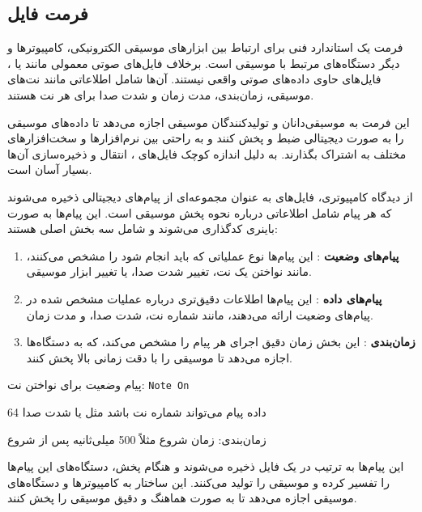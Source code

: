 \subsection{فرمت فایل }

فرمت   \cite{de2017understanding} یک استاندارد فنی برای ارتباط بین ابزارهای موسیقی الکترونیکی، کامپیوترها و دیگر دستگاه‌های مرتبط با موسیقی است. برخلاف فایل‌های صوتی معمولی مانند  یا ، فایل‌های  حاوی داده‌های صوتی واقعی نیستند. آن‌ها شامل اطلاعاتی مانند نت‌های موسیقی، زمان‌بندی، مدت زمان و شدت صدا برای هر نت هستند.

این فرمت به موسیقی‌دانان و تولیدکنندگان موسیقی اجازه می‌دهد تا داده‌های موسیقی را به صورت دیجیتالی ضبط و پخش کنند و به راحتی بین نرم‌افزارها و سخت‌افزارهای مختلف به اشتراک بگذارند. به دلیل اندازه کوچک فایل‌های ، انتقال و ذخیره‌سازی آن‌ها بسیار آسان است.

از دیدگاه کامپیوتری، فایل‌های  به عنوان مجموعه‌ای از پیام‌های دیجیتالی ذخیره می‌شوند که هر پیام شامل اطلاعاتی درباره نحوه پخش موسیقی است. این پیام‌ها به صورت باینری کدگذاری می‌شوند و شامل سه بخش اصلی هستند:

\begin{enumerate}
      \def\labelenumi{\arabic{enumi}.}
      \item
            \textbf{پیام‌های وضعیت }: این پیام‌ها نوع عملیاتی که
            باید انجام شود را مشخص می‌کنند، مانند نواختن یک نت، تغییر شدت صدا، یا
            تغییر ابزار موسیقی.
      \item
            \textbf{پیام‌های داده }: این پیام‌ها اطلاعات دقیق‌تری
            درباره عملیات مشخص شده در پیام‌های وضعیت ارائه می‌دهند، مانند شماره نت،
            شدت صدا، و مدت زمان.
      \item
            \textbf{زمان‌بندی }: این بخش زمان دقیق اجرای هر پیام را مشخص
            می‌کند، که به دستگاه‌ها اجازه می‌دهد تا موسیقی را با دقت زمانی بالا پخش
            کنند.
\end{enumerate}

\begin{example}[]
      \centering
      \label{example:}
      پیام وضعیت برای نواختن نت: \texttt{Note On}

      داده پیام می‌تواند شماره نت باشد مثل   یا شدت صدا 64

      زمان‌بندی: زمان شروع مثلاً 500 میلی‌ثانیه پس از شروع

      این پیام‌ها به ترتیب در یک فایل  ذخیره می‌شوند و هنگام پخش، دستگاه‌های  این پیام‌ها را تفسیر کرده و 
      موسیقی را تولید می‌کنند. این ساختار به کامپیوترها و دستگاه‌های موسیقی اجازه می‌دهد تا به صورت هماهنگ و دقیق موسیقی را پخش کنند.
      
\end{example}


